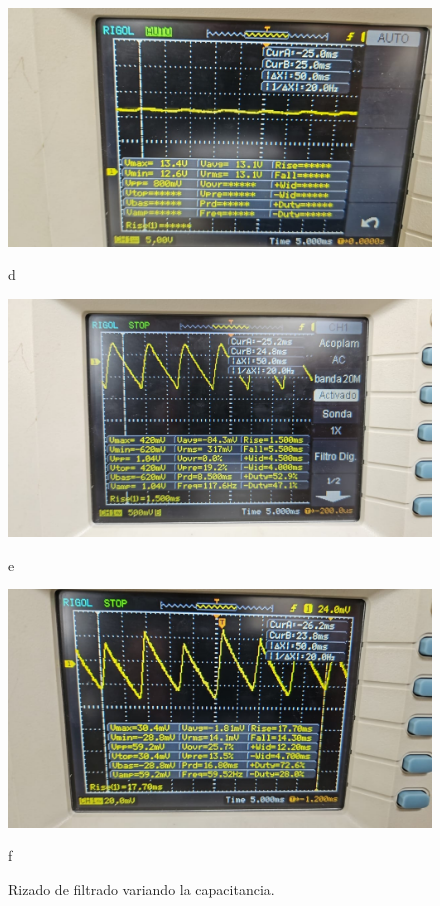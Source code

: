\documentclass[10pt,letterpaper]{article}
\begin{document}
\begin{figure}[H]
    \hfill
    \begin{minipage}[b]{0.45\textwidth}
        \centering
        \includegraphics[scale=0.2]{Filtrado9.jpg}
        \caption*{d}
    \end{minipage}
    \hfill
        \begin{minipage}[b]{0.45\textwidth}
        \centering
        \includegraphics[scale=0.2]{Filtrado4.jpg}
        \caption*{e}
    \end{minipage}
    \hfill
        \begin{minipage}[b]{0.45\textwidth}
        \centering
        \includegraphics[scale=0.2]{Filtrado5.jpg}
        \caption*{f}
    \end{minipage}
    \caption{Rizado de filtrado variando la capacitancia.}
    \label{fig:cuadricula}
\end{figure}
\end{document}
